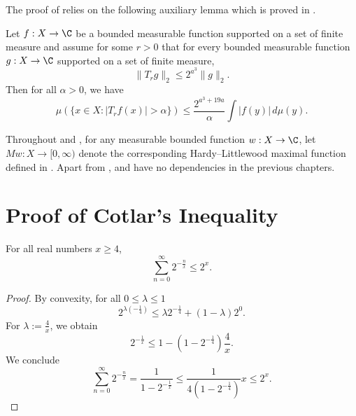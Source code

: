 The proof of  relies on the following auxiliary lemma which is proved in .
\begin{lemma}
    \label{calderon-zygmund-weak-1-1}
    \leanok
    Let $f:X\to\C$ be a bounded measurable function supported on a set of finite measure and assume for some $r>0$ that for every bounded measurable function $g:X\to\C$ supported on a set of finite measure,
    \begin{equation}
        \label{eq-strong-2-2-assumption}
        \|T_rg\|_{2}\le 2^{a^3} \|g\|_2.
    \end{equation}
    Then for all $\alpha>0$, we have
    \begin{equation}
        \label{eq-weak-1-1}
        \mu\left(\{x\in X: |T_r f(x)|>\alpha\}\right)\le \frac{2^{a^3 + 19a}}{\alpha} \int |f(y)|\, d\mu(y).
    \end{equation}
\end{lemma}
Throughout  and , for any measurable bounded function $w: X \to \C$, let $Mw: X \to [0, \infty)$ denote the corresponding Hardy--Littlewood maximal function defined in .
Apart from ,  and  have no dependencies in the previous chapters.



\section{Proof of Cotlar's Inequality}
\label{subsec-cotlar}

\begin{lemma}
    \label{geometric-series-estimate}
    \leanok
    For all real numbers $x\ge 4$,
    \begin{equation*}
        \sum_{n=0}^\infty 2^{-\frac{n}{x}} \le 2^x.
    \end{equation*}
\end{lemma}
\begin{proof}
    \leanok
    By convexity, for all $0\le\lambda\le1$
    \begin{equation*}
        2^{\lambda(-\frac{1}{4})} \le \lambda 2^{-\frac{1}{4}} + (1-\lambda)2^0.
    \end{equation*}
    For $\lambda:=\frac{4}{x}$, we obtain
    \begin{equation*}
        2^{-\frac 1 x} \le 1 - (1-2^{-\frac 1 4}) \frac{4}{x}.
    \end{equation*}
    We conclude
    \begin{equation*}
        \sum_{n=0}^\infty 2^{-\frac{n}{x}} = \frac{1}{1-2^{-\frac 1 x}} \le \frac{1}{4(1-2^{-\frac 1 4})} x \le 2^x.
    \end{equation*}
\end{proof}

